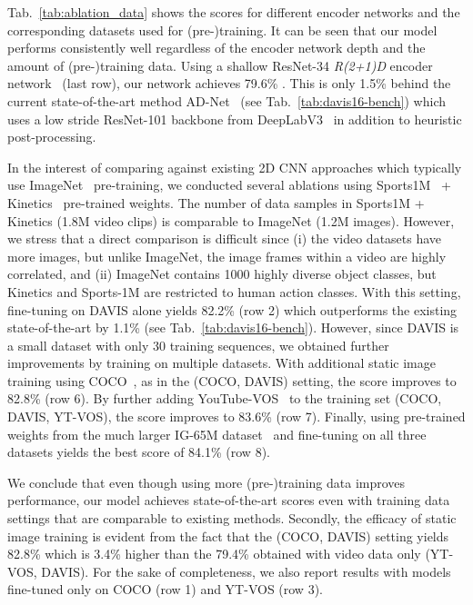 \documentclass{bmvc2k_arxiv}
\newcommand{\PAR}[1]{\vskip4pt \noindent {\bf #1~}}
\begin{document}
\PAR{Backbone and Training Data:}
Tab.~\ref{tab:ablation_data} shows the  scores for different encoder networks and the corresponding datasets used for (pre-)training. It can be seen that our model performs consistently well regardless of the encoder network depth and the amount of (pre-)training data.
Using a shallow ResNet-34 \textit{R(2+1)D} encoder network~\cite{Tran18CVPR} (last row), our network achieves 79.6\% . This is only 1.5\% behind the current state-of-the-art method AD-Net~\cite{Yang19ICCVAnchorDiff} (see Tab.~\ref{tab:davis16-bench}) which uses a low stride ResNet-101 backbone from DeepLabV3~\cite{Chen17ARXIV} in addition to heuristic post-processing.

In the interest of comparing against existing 2D CNN approaches which typically use ImageNet~\cite{Deng09CVPR} pre-training, we conducted several ablations using Sports1M~\cite{Karpathy14CVPR} + Kinetics~\cite{Kay17ARXIV} pre-trained weights. 
The number of data samples in Sports1M + Kinetics (1.8M video clips) is comparable to ImageNet (1.2M images). However, we stress that a direct comparison is difficult since (i) the video datasets have more images, but unlike ImageNet, the image frames within a video are highly correlated, and (ii) ImageNet contains 1000 highly diverse object classes, but Kinetics and Sports-1M are restricted to human action classes. 
With this setting, fine-tuning on DAVIS alone yields 82.2\%  (row 2) which outperforms the existing state-of-the-art by 1.1\% (see Tab.~\ref{tab:davis16-bench}). However, since DAVIS is a small dataset with only 30 training sequences, we obtained further improvements by training on multiple datasets. With additional static image training using COCO~\cite{Lin14ECCV}, as in the (COCO, DAVIS) setting, the score improves to 82.8\% (row 6). By further adding YouTube-VOS~\cite{Xu18ECCV} to the training set (COCO, DAVIS, YT-VOS), the score improves to 83.6\% (row 7). Finally, using pre-trained weights from the much larger IG-65M dataset~\cite{Ghadiyaram19CVPR} and fine-tuning on all three datasets yields the best score of 84.1\% (row 8).

We conclude that even though using more (pre-)training data improves performance, our model achieves state-of-the-art scores even with training data settings that are comparable to existing methods. Secondly, the efficacy of static image training is evident from the fact that the (COCO, DAVIS) setting yields 82.8\%  which is 3.4\% higher than the 79.4\% obtained with video data only (YT-VOS, DAVIS). For the sake of completeness, we also report results with models fine-tuned only on COCO (row 1) and YT-VOS (row 3).
\end{document}

